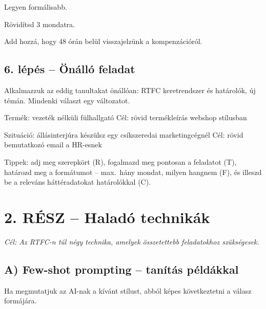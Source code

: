 \documentclass[11pt,a4paper]{article}
\begin{document}
\begin{prompt}[Finomítás]
Legyen formálisabb.
\end{prompt}
\begin{prompt}[Finomítás]
Rövidítsd 3 mondatra.
\end{prompt}
\begin{prompt}[Finomítás]
Add hozzá, hogy 48 órán belül visszajelzünk a kompenzációról.
\end{prompt}



\subsection{6. lépés -- Önálló feladat}

\noindent Alkalmazzuk az eddig tanultakat önállóan: RTFC keretrendszer és határolók, új témán. Mindenki választ egy változatot.

\begin{prompt}
Termék: vezeték nélküli fülhallgató
Cél: rövid termékleírás webshop stílusban
\end{prompt}

\begin{prompt}
Szituáció: állásinterjúra készülsz egy csíkszeredai marketingcégnél
Cél: rövid bemutatkozó email a HR-esnek
\end{prompt}

\noindent Tippek: adj meg szerepkört (R), fogalmazd meg pontosan a feladatot (T), határozd meg a formátumot -- max.\ hány mondat, milyen hangnem (F), és illeszd be a releváns háttéradatokat határolókkal (C).

\section{2. RÉSZ -- Haladó technikák}

\noindent\textit{Cél: Az RTFC-n túl négy technika, amelyek összetettebb feladatokhoz szükségesek.}

\bigskip

\subsection{A) Few-shot prompting -- tanítás példákkal}

Ha megmutatjuk az AI-nak a kívánt stílust, abból képes következtetni a válasz formájára.
\end{document}
